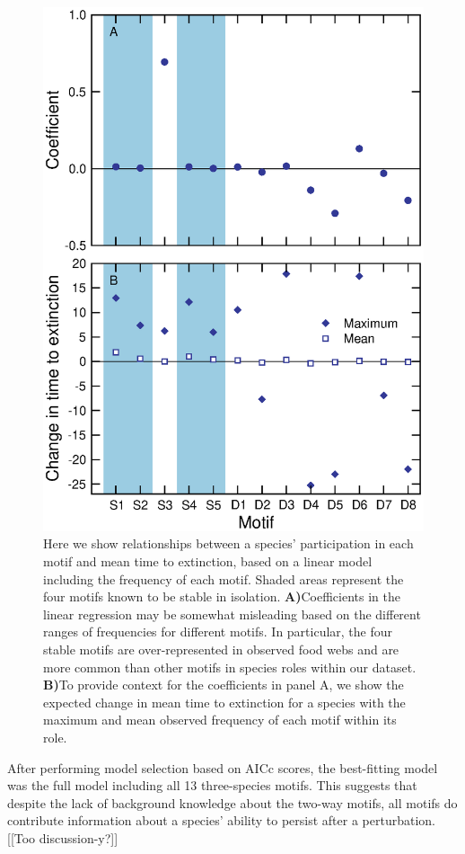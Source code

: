 \documentclass[12pt]{article}
\begin{document}
			\begin{figure}[h!]
				\caption{Here we show relationships between a species' participation in each motif and mean time to extinction, based on a linear model including the frequency of each motif. Shaded areas represent the four motifs known to be stable in isolation. \textbf{A)}Coefficients in the linear regression may be somewhat misleading based on the different ranges of frequencies for different motifs. In particular, the four stable motifs are over-represented in observed food webs and are more common than other motifs in species roles within our dataset. \textbf{B)}To provide context for the coefficients in panel A, we show the expected change in mean time to extinction for a species with the maximum and mean observed frequency of each motif within its role.}
				\label{motif_coefs}
				\includegraphics[width=.75\textwidth]{figures/extinction_order/motif_lmer_summary.eps}
				\end{figure}


			After performing model selection based on AICc scores, the best-fitting model was the full model including all 13 three-species motifs.
			This suggests that despite the lack of background knowledge about the two-way motifs, all motifs do contribute information about a species' ability to persist after a perturbation. [[Too discussion-y?]]
\end{document}
